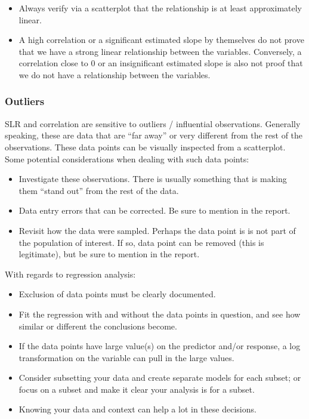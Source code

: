 \documentclass[
]{book}
\providecommand{\tightlist}{%
  \setlength{\itemsep}{0pt}\setlength{\parskip}{0pt}}
\begin{document}
\begin{itemize}
\tightlist
\item
  Always verify via a scatterplot that the relationship is at least approximately linear.
\item
  A high correlation or a significant estimated slope by themselves do not prove that we have a strong linear relationship between the variables. Conversely, a correlation close to 0 or an insignificant estimated slope is also not proof that we do not have a relationship between the variables.
\end{itemize}

\hypertarget{outliers}{%
\subsubsection{Outliers}\label{outliers}}

SLR and correlation are sensitive to outliers / influential observations. Generally speaking, these are data that are ``far away'' or very different from the rest of the observations. These data points can be visually inspected from a scatterplot. Some potential considerations when dealing with such data points:

\begin{itemize}
\tightlist
\item
  Investigate these observations. There is usually something that is making them ``stand out'' from the rest of the data.
\item
  Data entry errors that can be corrected. Be sure to mention in the report.
\item
  Revisit how the data were sampled. Perhaps the data point is is not part of the population of interest. If so, data point can be removed (this is legitimate), but be sure to mention in the report.
\end{itemize}

With regards to regression analysis:

\begin{itemize}
\tightlist
\item
  Exclusion of data points must be clearly documented.
\item
  Fit the regression with and without the data points in question, and see how similar or different the conclusions become.
\item
  If the data points have large value(s) on the predictor and/or response, a log transformation on the variable can pull in the large values.
\item
  Consider subsetting your data and create separate models for each subset; or focus on a subset and make it clear your analysis is for a subset.
\item
  Knowing your data and context can help a lot in these decisions.
\end{itemize}
\end{document}

